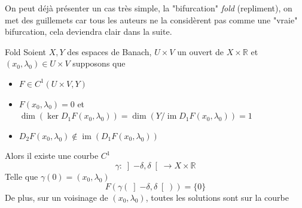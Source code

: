 \documentclass[a4paper,12pt,oneside,titlepage]{article}
\newcommand{\R}[0]{\mathbb{R}}
\newcommand{\im}[0]{\operatorname{im}}
\theoremstyle{definition}
\theoremstyle{plain}
\begin{document}
On peut déjà présenter un cas très simple, la "bifurcation" \textit{fold} (repliment), on met des guillemets car tous les auteurs ne la considèrent pas comme une "vraie" bifurcation, cela deviendra clair dans la suite.
\begin{theobox} {Fold}{}\label{fold}
    Soient $X,Y$ des espaces de Banach, $U\times V$ un ouvert de $X\times \R$ et $(x_0,\lambda_0)\in U\times V $
    supposons que
    \begin{itemize}
        \item $F\in C^1(U\times V,Y)$
        \item $F(x_0,\lambda_0)=0$ et $\dim (\ker D_1F(x_0,\lambda_0))=\dim (Y/ \im D_1F(x_0,\lambda_0))=1$
        \item $D_2F(x_0,\lambda_0)\notin \im(D_1F(x_0,\lambda_0))$
    \end{itemize}
    Alors il existe une courbe $C^1$
    \begin{equation*}
        \gamma:   \left] -\delta,\delta\right[ \rightarrow X\times\R 
    \end{equation*}
    Telle que $\gamma(0)=(x_0,\lambda_0)$
    \begin{equation*}
        F(\gamma(\left] -\delta,\delta\right[))= \{0\}
    \end{equation*}
    De plus, sur un voisinage de $(x_0,\lambda_0)$, toutes les solutions sont sur la courbe
\end{theobox}
\end{document}
